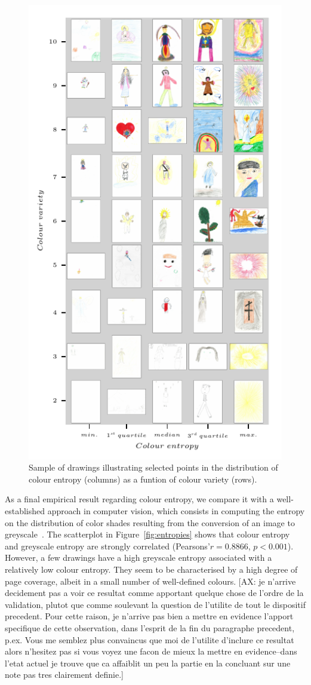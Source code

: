 \documentclass[11pt,a4paper]{article}
\begin{document}
\begin{figure}
	\centering
	\includegraphics[width=0.75\linewidth]{figures/colors-grille.pdf}
	\caption{Sample of drawings illustrating selected points in the distribution of colour entropy (columns) as a funtion of colour variety (rows).}
	\label{fig:grille}
\end{figure}

As a final empirical result regarding colour entropy, we compare it with a well-established approach in computer vision, which consists in computing the entropy on the distribution of color shades resulting from the conversion of an image to greyscale~\cite[see e.g.][]{wu2013}. The scatterplot in Figure~\ref{fig:entropies} shows that colour entropy and greyscale entropy are strongly correlated (Pearsons'$r=0.8866$, $p<0.001$). However, a few drawings have a high greyscale entropy associated with a relatively low colour entropy. They seem to be characterised by a high degree of page coverage, albeit in a small number of well-defined colours. {\color{green}[AX: je n'arrive decidement pas a voir ce resultat comme apportant quelque chose de l'ordre de la validation, plutot que comme soulevant la question de l'utilite de tout le dispositif precedent. Pour cette raison, je n'arrive pas bien a mettre en evidence l'apport specifique de cette observation, dans l'esprit de la fin du paragraphe precedent, p.ex. Vous me semblez plus convaincus que moi de l'utilite d'inclure ce resultat alors n'hesitez pas si vous voyez une facon de mieux la mettre en evidence--dans l'etat actuel je trouve que ca affaiblit un peu la partie en la concluant sur une note pas tres clairement definie.]} 
\end{document}
